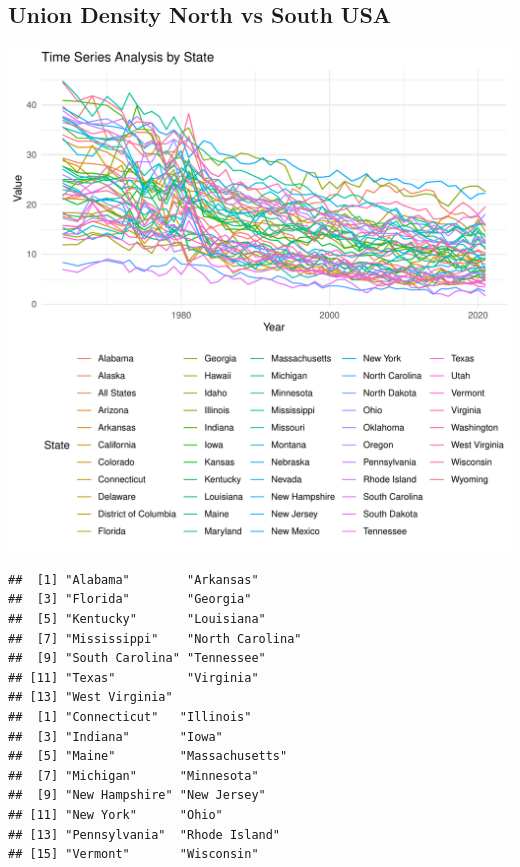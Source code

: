 \documentclass[11pt]{article}\usepackage[]{graphicx}\usepackage[]{xcolor}
\makeatletter
\def\maxwidth{ %
  \ifdim\Gin@nat@width>\linewidth
    \linewidth
  \else
    \Gin@nat@width
  \fi
}
\newenvironment{kframe}{%
 \def\at@end@of@kframe{}%
 \ifinner\ifhmode%
  \def\at@end@of@kframe{\end{minipage}}%
  \begin{minipage}{\columnwidth}%
 \fi\fi%
 \def\FrameCommand##1{\hskip\@totalleftmargin \hskip-\fboxsep
 \colorbox{shadecolor}{##1}\hskip-\fboxsep
     \hskip-\linewidth \hskip-\@totalleftmargin \hskip\columnwidth}%
 \MakeFramed {\advance\hsize-\width
   \@totalleftmargin\z@ \linewidth\hsize
   \@setminipage}}%
 {\par\unskip\endMakeFramed%
 \at@end@of@kframe}
\newenvironment{knitrout}{}{} %
\makeatother
\begin{document}
\subsection{Union Density North vs South USA}
\begin{knitrout}
\color{fgcolor}
\includegraphics[width=\maxwidth]{figure/unnamed-chunk-1-1} 
\begin{kframe}\begin{verbatim}
##  [1] "Alabama"        "Arkansas"      
##  [3] "Florida"        "Georgia"       
##  [5] "Kentucky"       "Louisiana"     
##  [7] "Mississippi"    "North Carolina"
##  [9] "South Carolina" "Tennessee"     
## [11] "Texas"          "Virginia"      
## [13] "West Virginia"
##  [1] "Connecticut"   "Illinois"     
##  [3] "Indiana"       "Iowa"         
##  [5] "Maine"         "Massachusetts"
##  [7] "Michigan"      "Minnesota"    
##  [9] "New Hampshire" "New Jersey"   
## [11] "New York"      "Ohio"         
## [13] "Pennsylvania"  "Rhode Island" 
## [15] "Vermont"       "Wisconsin"
\end{verbatim}
\end{kframe}

\end{knitrout}
\end{document}
